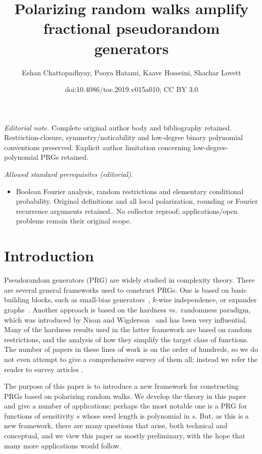 \documentclass[11pt]{article}
\title{Polarizing random walks amplify fractional pseudorandom generators}
\author{Eshan Chattopadhyay, Pooya Hatami, Kaave Hosseini, Shachar Lovett}
\date{doi:10.4086/toc.2019.v015a010; CC BY 3.0}
\numberwithin{equation}{section}
\theoremstyle{definition}
\theoremstyle{plain}
\begin{document}
\maketitle
\noindent\textit{Editorial note.} Complete original author body and bibliography retained. Restriction-closure, symmetry/noticability and low-degree binary polynomial conventions preserved. Explicit author limitation concerning low-degree-polynomial PRGs retained.\par\medskip
\noindent\textit{Allowed standard prerequisites (editorial).}\begin{itemize}
\item Boolean Fourier analysis, random restrictions and elementary conditional probability. Original definitions and all local polarization, rounding or Fourier recurrence arguments retained.. No collector reproof; applications/open problems remain their original scope.
\end{itemize}\medskip
\section{Introduction}

Pseudorandom generators (PRG) are widely studied in complexity theory. There are several general frameworks used to construct PRGs.
One is based on basic building blocks, such as
%
small-bias   %
generators~\cite{naor1993small,alon1992simple}, $k$-wise independence,
or expander graphs~\cite{hoory2006expander}. Another approach is based on
the %
hardness vs.\ randomness paradigm, which was introduced by
Nisan and Wigderson~\cite{nisan1988hardness} and has been very influential. Many of the hardness results used in the latter framework
are based on random restrictions, and the analysis of how
they simplify the target class of functions.
%
The number of papers in these lines of work is on the
order of hundreds, so we do not even attempt to give a comprehensive survey of them all; instead we refer the reader to survey articles \cite{goldreich2010primer,vadhan2012pseudorandomness}.

The purpose of this paper is to introduce a new framework for constructing PRGs based on polarizing random walks. We develop the theory
in this paper and give a number of applications; perhaps the most notable one is a PRG for functions of sensitivity $s$ whose seed
length is polynomial in $s$. But, as this is a new framework, there are many questions that arise, both technical and conceptual,
and we view this paper as mostly preliminary, with the hope that many more applications would follow.
\end{document}

